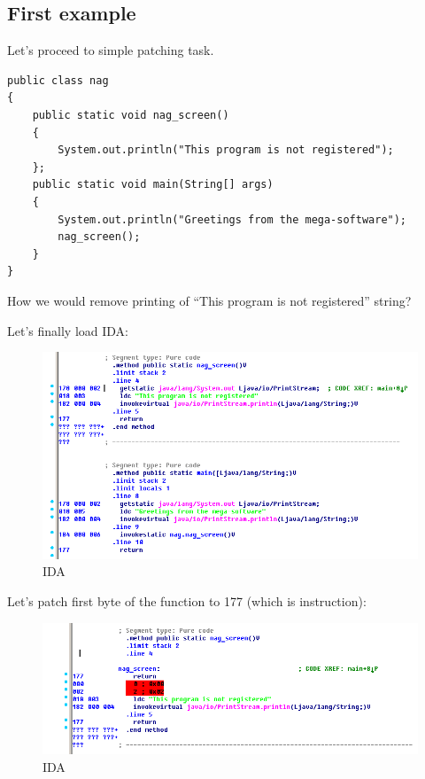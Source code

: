 \subsection{First example}

Let's proceed to simple patching task.

\begin{lstlisting}
public class nag
{
	public static void nag_screen()
	{
		System.out.println("This program is not registered");
	};
	public static void main(String[] args) 
	{
		System.out.println("Greetings from the mega-software");
		nag_screen();
	}
}
\end{lstlisting}

How we would remove printing of ``This program is not registered'' string?

Let's finally load IDA:

\begin{figure}[H]
\centering
\includegraphics[scale=\FigScale]{Java_and_NET/java/13_patching/1/1.png}
\caption{IDA}
\end{figure}

Let's patch first byte of the function to 177 (which is  instruction):

\begin{figure}[H]
\centering
\includegraphics[scale=\FigScale]{Java_and_NET/java/13_patching/1/2.png}
\caption{IDA}
\end{figure}

